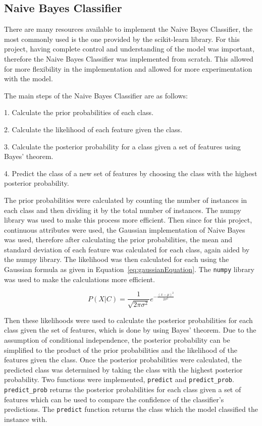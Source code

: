 \subsection{Naive Bayes Classifier}

There are many resources available to implement the Naive Bayes Classifier, the most commonly used is the one provided by the scikit-learn library. For this project, having complete control and understanding of the model was important, therefore the Naive Bayes Classifier was implemented from scratch. This allowed for more flexibility in the implementation and allowed for more experimentation with the model. 

The main steps of the Naive Bayes Classifier are as follows:


1. Calculate the prior probabilities of each class.

2. Calculate the likelihood of each feature given the class.

3. Calculate the posterior probability for a class given a set of features using Bayes' theorem.

4. Predict the class of a new set of features by choosing the class with the highest posterior probability.

The prior probabilities were calculated by counting the number of instances in each class and then dividing it by the total number of instances. The numpy library was used to make this process more efficient. Then since for this project, continuous attributes were used, the Gaussian implementation of Naive Bayes was used, therefore after calculating the prior probabilities, the mean and standard deviation of each feature was calculated for each class, again aided by the numpy library.  The likelihood was then calculated for each using the Gaussian formula as given in Equation~\ref{eq:gaussianEquation}. The \texttt{numpy} library was used to make the calculations more efficient.


\begin{equation}
    \label{eq:gaussianEquation}
    P(X | C) = \frac{1}{\sqrt{2\pi\sigma^2}} e^{-\frac{(x - \mu)^2}{2\sigma^2}}
\end{equation}

Then these likelihoods were used to calculate the posterior probabilities for each class given the set of features, which is done by using Bayes' theorem. Due to the assumption of conditional independence, the posterior probability can be simplified to the product of the prior probabilities and the likelihood of the features given the class. Once the posterior probabilities were calculated, the predicted class was determined by taking the class with the highest posterior probability. Two functions were implemented, \texttt{predict} and \texttt{predict\_prob}. \texttt{predict\_prob} returns the posterior probabilities for each class given a set of features which can be used to compare the confidence of the classifier's predictions. The \texttt{predict} function returns the class which the model classified the instance with.

